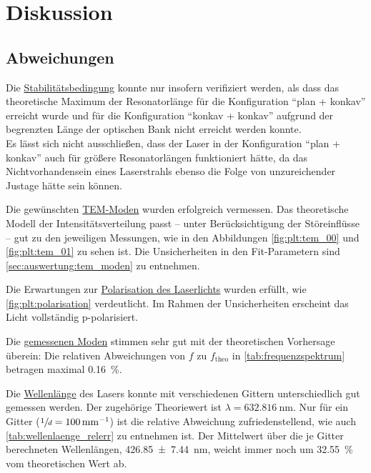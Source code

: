 \section{Diskussion}
\label{sec:diskussion}

\subsection{Abweichungen}
    Die \hyperref[sec:auswertung:stabilitaetsbedingung]{Stabilitätsbedingung} konnte nur insofern verifiziert werden,
    als dass das theoretische Maximum der Resonatorlänge
    für die Konfiguration \enquote{plan + konkav} erreicht wurde
    und für die Konfiguration \enquote{konkav + konkav} aufgrund der begrenzten Länge der optischen Bank nicht erreicht werden konnte.\\
    Es lässt sich nicht ausschließen,
    dass der Laser in der Konfiguration \enquote{plan + konkav} auch für größere Resonatorlängen funktioniert hätte,
    da das Nichtvorhandensein eines Laserstrahls ebenso die Folge von unzureichender Justage hätte sein können.


    Die gewünschten \hyperref[sec:auswertung:tem_moden]{TEM-Moden} wurden erfolgreich vermessen.
    Das theoretische Modell der Intensitätsverteilung passt
    – unter Berücksichtigung der Störeinflüsse –
    gut zu den jeweiligen Messungen,
    wie in den Abbildungen \ref{fig:plt:tem_00} und \ref{fig:plt:tem_01} zu sehen ist.
    Die Unsicherheiten in den Fit-Parametern sind \autoref{sec:auswertung:tem_moden} zu entnehmen.


    Die Erwartungen zur \hyperref[sec:auswertung:polarisation]{Polarisation des Laserlichts} wurden erfüllt,
    wie \autoref{fig:plt:polarisation} verdeutlicht.
    Im Rahmen der Unsicherheiten erscheint das Licht vollständig p-polarisiert.


    Die \hyperref[sec:auswertung:frequenzspektrum]{gemessenen Moden} stimmen sehr gut mit der theoretischen Vorhersage überein:
    Die relativen Abweichungen von $f$ zu $f_\text{theo}$ in \autoref{tab:frequenzspektrum} betragen maximal \SI{0.16}{\percent}.


    Die \hyperref[sec:auswertung:wellenlaenge]{Wellenlänge} des Lasers konnte mit verschiedenen Gittern unterschiedlich gut gemessen werden.
    Der zugehörige Theoriewert ist $\lambda = \SI{632.816}{\nano\meter}$.
    Nur für ein Gitter ($\sfrac{1}{d} = \SI[per-mode=reciprocal]{100}{\per\milli\meter}$)
    ist die relative Abweichung zufriedenstellend,
    wie auch \autoref{tab:wellenlaenge_relerr} zu entnehmen ist.
    Der Mittelwert über die je Gitter berechneten Wellenlängen,
    \SI{426.85 \pm 7.44}{\nano\meter},
    weicht immer noch um \SI{32.55}{\percent} vom theoretischen Wert ab.

